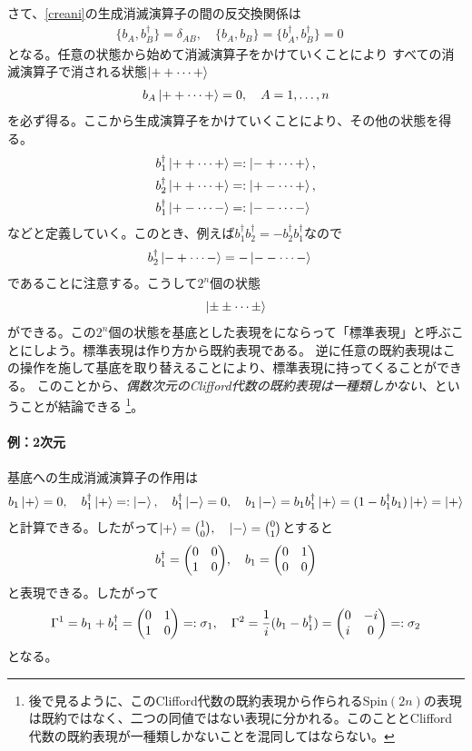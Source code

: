 \documentclass[12pt,a4paper]{jlreq}
\begin{document}
さて、\eqref{creani}の生成消滅演算子の間の反交換関係は
\begin{align}
  \{b_A,b_B^{\dag}\}=\delta_{AB},\quad
  \{b_A,b_B\}=
  \{b_A^{\dag},b_B^{\dag}\}=0\quad
\end{align}
となる。任意の状態から始めて消滅演算子をかけていくことにより
すべての消滅演算子で消される状態$\ket{++\dots+}$
\begin{align}
  b_A\ket{++\dots+}=0,\quad A=1,\dots,n
\end{align}
を必ず得る。ここから生成演算子をかけていくことにより、その他の状態を得る。
\begin{align}
  &b_1^{\dag}\ket{++\dots +}=:\ket{-+\dots +},\\
  &b_2^{\dag}\ket{++\dots +}=:\ket{+-\dots +},\\
  &b_1^{\dag}\ket{+-\dots -}=:\ket{--\dots -}
\end{align}
などと定義していく。このとき、例えば$b_1^{\dag}b_2^{\dag}=-b_2^{\dag}b_1^{\dag}$なので
\begin{align}
  &b_2^{\dag}\ket{-+\dots -}=-\ket{--\dots -}
\end{align}
であることに注意する。こうして$2^n$個の状態
\begin{align}
  \ket{\pm\pm\cdots\pm}
\end{align}
ができる。この$2^n$個の状態を基底とした表現を\cite{Kugo}にならって「標準表現」と呼ぶことにしよう。標準表現は作り方から既約表現である。
逆に任意の既約表現はこの操作を施して基底を取り替えることにより、標準表現に持ってくることができる。
このことから、\emph{偶数次元のClifford代数の既約表現は一種類しかない}、ということが結論できる
\footnote{後で見るように、このClifford代数の既約表現から作られるSpin$(2n)$の表現は既約ではなく、二つの同値ではない表現に分かれる。このこととClifford代数の既約表現が一種類しかないことを混同してはならない。}。

\paragraph{例：2次元}
基底への生成消滅演算子の作用は
\begin{align}
  b_1\ket{+}=0,\quad b_1^{\dag}\ket{+}=:\ket{-},\quad b_1^{\dag}\ket{-}=0,\quad b_1\ket{-}=b_1b_1^{\dag}\ket{+}
  =(1-b_1^{\dag}b_1)\ket{+}=\ket{+}
\end{align}
と計算できる。したがって$\ket{+}=\binom{1}{0},\quad \ket{-}=\binom{0}{1}$とすると
\begin{align*}
  b_1^{\dag}=
  \mqty(0&0\\1&0),\quad
  b_1=\mqty(0&1\\0&0)
\end{align*}
と表現できる。したがって
\begin{align*}
  \Gamma^{1}=b_1+b_1^{\dag}=\mqty(0&1\\  1&0)=:\sigma_1,\quad
  \Gamma^{2}=\frac{1}{i}(b_1-b_1^{\dag})=\mqty(0&-i\\  i&0)=:\sigma_2
\end{align*}
となる。
\end{document}
